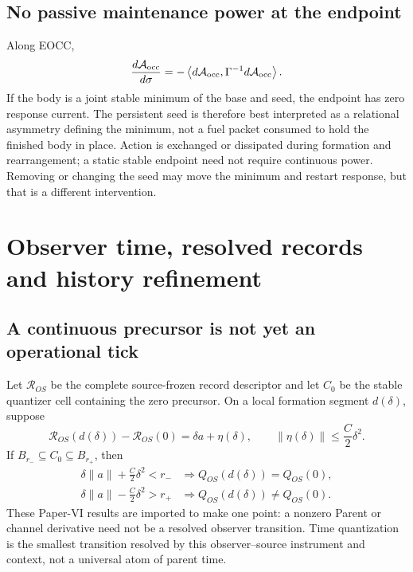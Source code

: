 \documentclass[11pt]{article}
\begin{document}
\subsection{No passive maintenance power at the endpoint}

Along EOCC,
\begin{equation}
 \frac{d\mathcal A_{\rm occ}}{d\sigma}
 =-\left\langle d\mathcal A_{\rm occ},
 \Gamma^{-1}d\mathcal A_{\rm occ}\right\rangle.
 \label{eq:lyapunov}
\end{equation}
If the body is a joint stable minimum of the base and seed, the endpoint has
zero response current.  The persistent seed is therefore best interpreted as
a relational asymmetry defining the minimum, not a fuel packet consumed to
hold the finished body in place.  Action is exchanged or dissipated during
formation and rearrangement; a static stable endpoint need not require
continuous power.  Removing or changing the seed may move the minimum and
restart response, but that is a different intervention.

\section{Observer time, resolved records and history refinement}

\subsection{A continuous precursor is not yet an operational tick}

Let \(\mathcal R_{OS}\) be the complete source-frozen record descriptor and
let \(C_0\) be the stable quantizer cell containing the zero precursor.  On a
local formation segment \(d(\delta)\), suppose
\begin{equation}
 \mathcal R_{OS}(d(\delta))-\mathcal R_{OS}(0)
 =\delta a+\eta(\delta),
 \qquad \|\eta(\delta)\|\le \frac{C}{2}\delta^2.
 \label{eq:record-jet}
\end{equation}
If \(B_{r_-}\subseteq C_0\subseteq B_{r_+}\), then
\begin{align}
 \delta\|a\|+\frac{C}{2}\delta^2<r_-
 &\Longrightarrow Q_{OS}(d(\delta))=Q_{OS}(0),
 \label{eq:unresolved-cell}\\
 \delta\|a\|-\frac{C}{2}\delta^2>r_+
 &\Longrightarrow Q_{OS}(d(\delta))\ne Q_{OS}(0).
 \label{eq:resolved-cell}
\end{align}
These Paper-VI results are imported to make one point: a nonzero Parent or
channel derivative need not be a resolved observer transition.  Time
quantization is the smallest transition resolved by this observer--source
instrument and context, not a universal atom of parent time.
\end{document}
